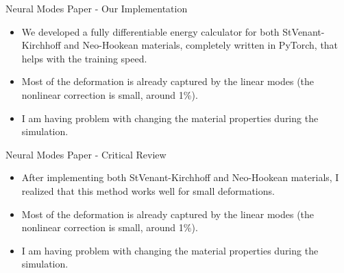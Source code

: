 \documentclass{beamer}
\begin{document}
\begin{frame}{Neural Modes Paper - Our Implementation}
    \begin{itemize}
        \item We developed a fully differentiable energy calculator for both StVenant-Kirchhoff and Neo-Hookean materials, completely written in PyTorch, that helps with the training speed.
        \item Most of the deformation is already captured by the linear modes (the nonlinear correction is small, around 1\%).
        \item I am having problem with changing the material properties during the simulation.
    \end{itemize}
\end{frame}




\begin{frame}{Neural Modes Paper - Critical Review}
    \begin{itemize}
        \item After implementing both StVenant-Kirchhoff and Neo-Hookean materials, I realized that this method works well for small deformations.
        \item Most of the deformation is already captured by the linear modes (the nonlinear correction is small, around 1\%).
        \item I am having problem with changing the material properties during the simulation.
    \end{itemize}
\end{frame}
\end{document}
